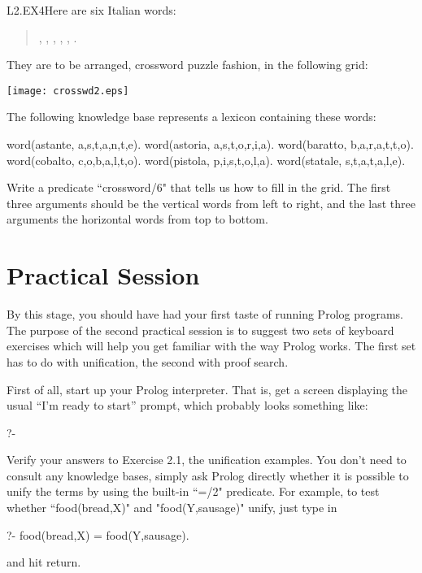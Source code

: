 \begin{LPNexercise}{L2.EX4}Here are six Italian words:
\begin{quote}
, , ,
, , .
\end{quote}
\noindent
They are to be arranged, crossword puzzle
fashion, in the following grid:

\bigskip
\begin{center}
\texttt{[image: crosswd2.eps]}
\end{center}
\bigskip

The following knowledge base represents a lexicon containing these
words:
\begin{LPNcodedisplay}
word(astante, a,s,t,a,n,t,e).
word(astoria, a,s,t,o,r,i,a).
word(baratto, b,a,r,a,t,t,o).
word(cobalto, c,o,b,a,l,t,o).
word(pistola, p,i,s,t,o,l,a).
word(statale, s,t,a,t,a,l,e).
\end{LPNcodedisplay}
Write a predicate ``crossword/6" that tells us how to fill in the grid.
The first three arguments should be the vertical words from left to
right, and the last three arguments the horizontal words from top
to bottom.\end{LPNexercise}


\section{Practical Session}\label{SEC.L2.PRAXIS}


By this stage, you should have had your first taste of running Prolog
programs. The purpose of the second practical session is to suggest
two sets of keyboard exercises which will help you get familiar with
the way Prolog works. The first set has to do with unification, the
second with proof search.

First of all, start up your Prolog interpreter. That is, get a screen
displaying the usual ``I'm ready to start'' prompt, which probably looks
something like:
\begin{LPNcodedisplay}
?-
\end{LPNcodedisplay}
Verify your answers to Exercise 2.1, the unification examples. You
don't need to consult any knowledge bases, simply ask Prolog directly
whether it is possible to unify the terms by using the built-in ``=/2"
predicate. For example, to test whether ``food(bread,X)" and
"food(Y,sausage)" unify, just type in
\begin{LPNcodedisplay}
?- food(bread,X) = food(Y,sausage).
\end{LPNcodedisplay}
%
and hit return.

